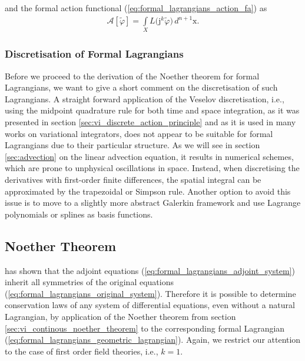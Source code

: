 \documentclass[12pt,a4paper,reqno]{article}
\begin{document}
and the formal action functional (\ref{eq:formal_lagrangians_action_fa}) as
\begin{align}\label{eq:adjoint_action}
\mathcal{A} [\tilde{\ensuremath{\varphi}}] = \int \limits_{X} L \big( {\ensuremath{\mathrm{j}}}^{k} \tilde{\ensuremath{\varphi}} \big) \, d^{n+1} {\ensuremath{{\ensuremath{\mathrm{{x}}}}}} .
\end{align}

\subsubsection*{Discretisation of Formal Lagrangians}

Before we proceed to the derivation of the Noether theorem for formal Lagrangians, we want to give a short comment on the discretisation of such Lagrangians.
A straight forward application of the Veselov discretisation, i.e., using the midpoint quadrature rule for both time and space integration, as it was presented in section \ref{sec:vi_discrete_action_principle} and as it is used in many works on variational integrators, does not appear to be suitable for formal Lagrangians due to their particular structure.
As we will see in section \ref{sec:advection} on the linear advection equation, it results in numerical schemes, which are prone to unphysical oscillations in space. 
Instead, when discretising the derivatives with first-order finite differences, the spatial integral can be approximated by the trapezoidal or Simpson rule. Another option to avoid this issue is to move to a slightly more abstract Galerkin framework and use Lagrange polynomials \cite{Chen:2008} or splines \cite{Kraus:2015:Splines} as basis functions.

\subsection{Noether Theorem}
\label{sec:formal_lagrangians_noether_theorem}

\citet{Ibragimov:2007a} has shown that the adjoint equations (\ref{eq:formal_lagrangians_adjoint_system}) inherit all symmetries of the original equations (\ref{eq:formal_lagrangians_original_system}).
Therefore it is possible to determine conservation laws of any system of differential equations, even without a natural Lagrangian, by application of the Noether theorem from section \ref{sec:vi_continous_noether_theorem} to the corresponding formal Lagrangian (\ref{eq:formal_lagrangians_geometric_lagrangian}).
Again, we restrict our attention to the case of first order field theories, i.e., $k=1$.
\end{document}
